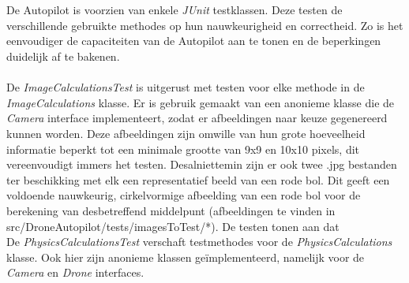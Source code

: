 \\
\\
De Autopilot is voorzien van enkele \textit{JUnit} testklassen. Deze testen de verschillende gebruikte methodes op hun nauwkeurigheid en correctheid. Zo is het eenvoudiger de capaciteiten van de Autopilot aan te tonen en de beperkingen duidelijk af te bakenen.
\\
\\
De \textit{ImageCalculationsTest} is uitgerust met testen voor elke methode in de \textit{ImageCalculations} klasse. Er is gebruik gemaakt van een anonieme klasse die de \textit{Camera} interface implementeert, zodat er afbeeldingen naar keuze gegenereerd kunnen worden. Deze afbeeldingen zijn omwille van hun grote hoeveelheid informatie beperkt tot een minimale grootte van 9x9 en 10x10 pixels, dit vereenvoudigt immers het testen. Desalniettemin zijn er ook twee .jpg bestanden ter beschikking met elk een representatief beeld van een rode bol. Dit geeft een voldoende nauwkeurig, cirkelvormige afbeelding van een rode bol voor de berekening van desbetreffend middelpunt (afbeeldingen te vinden in src/DroneAutopilot/tests/imagesToTest/*). De testen tonen aan dat 
\\
De \textit{PhysicsCalculationsTest} verschaft testmethodes voor de \textit{PhysicsCalculations} klasse. Ook hier zijn anonieme klassen ge\"implementeerd, namelijk voor de \textit{Camera} en \textit{Drone} interfaces.



